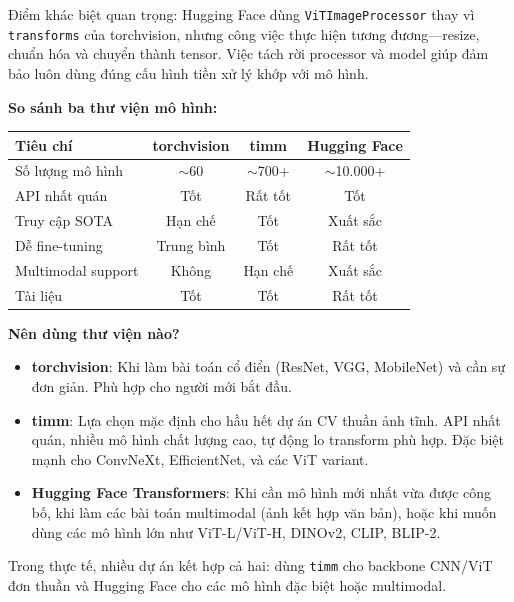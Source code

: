 Điểm khác biệt quan trọng: Hugging Face dùng \texttt{ViTImageProcessor} thay vì \texttt{transforms} của torchvision, nhưng công việc thực hiện tương đương---resize, chuẩn hóa và chuyển thành tensor. Việc tách rời processor và model giúp đảm bảo luôn dùng đúng cấu hình tiền xử lý khớp với mô hình.

\vspace{0.5em}
\textbf{So sánh ba thư viện mô hình:}

\begin{center}
\begin{tabular}{lccc}
\hline
\textbf{Tiêu chí} & \textbf{torchvision} & \textbf{timm} & \textbf{Hugging Face} \\
\hline
Số lượng mô hình    & $\sim$60   & $\sim$700+    & $\sim$10.000+  \\
API nhất quán       & Tốt        & Rất tốt       & Tốt            \\
Truy cập SOTA       & Hạn chế    & Tốt           & Xuất sắc       \\
Dễ fine-tuning      & Trung bình & Tốt           & Rất tốt        \\
Multimodal support  & Không      & Hạn chế       & Xuất sắc       \\
Tài liệu            & Tốt        & Tốt           & Rất tốt        \\
\hline
\end{tabular}
\end{center}

\begin{mdframed}[style=infobox]
\textbf{Nên dùng thư viện nào?}

\begin{itemize}
    \item \textbf{torchvision}: Khi làm bài toán cổ điển (ResNet, VGG, MobileNet) và cần sự đơn giản. Phù hợp cho người mới bắt đầu.

    \item \textbf{timm}: Lựa chọn mặc định cho hầu hết dự án CV thuần ảnh tĩnh. API nhất quán, nhiều mô hình chất lượng cao, tự động lo transform phù hợp. Đặc biệt mạnh cho ConvNeXt, EfficientNet, và các ViT variant.

    \item \textbf{Hugging Face Transformers}: Khi cần mô hình mới nhất vừa được công bố, khi làm các bài toán multimodal (ảnh kết hợp văn bản), hoặc khi muốn dùng các mô hình lớn như ViT-L/ViT-H, DINOv2, CLIP, BLIP-2.
\end{itemize}

Trong thực tế, nhiều dự án kết hợp cả hai: dùng \texttt{timm} cho backbone CNN/ViT đơn thuần và Hugging Face cho các mô hình đặc biệt hoặc multimodal.
\end{mdframed}
